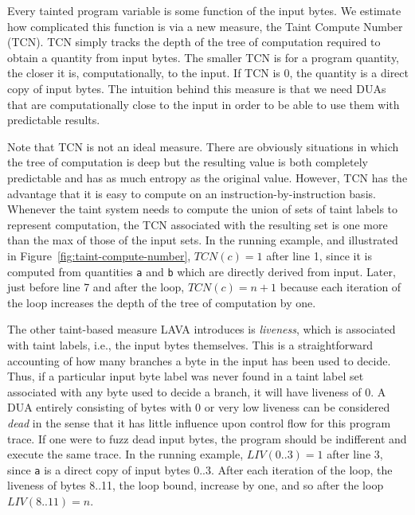 \noindent
Every tainted program variable is some function of the input bytes.
We estimate how complicated this function is via a new measure, the Taint Compute Number (TCN).
TCN simply tracks the depth of the tree of computation required to obtain a quantity from input bytes.
The smaller TCN is for a program quantity, the closer it is, computationally, to the input.
If TCN is 0, the quantity is a direct copy of input bytes.
The intuition behind this measure is that we need DUAs that are computationally close to the input in order to be able to use them with predictable results.

Note that TCN is not an ideal measure.
There are obviously situations in which the tree of computation is deep but the resulting value is both completely predictable and has as much entropy as the original value.
However, TCN has the advantage that it is easy to compute on an instruction-by-instruction basis.
Whenever the taint system needs to compute the union of sets of taint labels to represent computation, the TCN associated with the resulting set is one more than the max of those of the input sets.
In the running example, and illustrated in Figure~\ref{fig:taint-compute-number}, $TCN(c)=1$ after line 1, since it is computed from quantities \verb+a+ and \verb+b+ which are directly derived from input.
Later, just before line 7 and after the loop, $TCN(c)=n+1$ because each iteration of the loop increases the depth of the tree of computation by one.  

The other taint-based measure LAVA introduces is \emph{liveness}, which is associated with taint labels, i.e., the input bytes themselves.
This is a straightforward accounting of how many branches a byte in the input has been used to decide.
Thus, if a particular input byte label was never found in a taint label set associated with any byte used to decide a branch, it will have liveness of 0.
A DUA entirely consisting of bytes with 0 or very low liveness can be considered \emph{dead} in the sense that it has little influence upon control flow for this program trace.
If one were to fuzz dead input bytes, the program should be indifferent and execute the same trace.  
In the running example, $LIV(0..3)=1$ after line 3, since \verb+a+ is a direct copy of input bytes 0..3.
After each iteration of the loop, the liveness of bytes 8..11, the loop bound, increase by one, and so after the loop $LIV(8..11)=n$.

